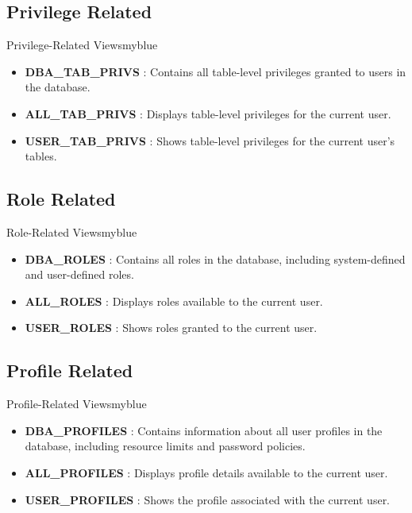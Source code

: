 \vspace{0.25cm}
\subsection{Privilege Related}
\begin{prettyBox}{Privilege-Related Views}{myblue}
\begin{itemize}
    \item \textbf{DBA\_TAB\_PRIVS} : Contains all table-level privileges granted to users in the database.
    \item \textbf{ALL\_TAB\_PRIVS} : Displays table-level privileges for the current user.
    \item \textbf{USER\_TAB\_PRIVS} : Shows table-level privileges for the current user's tables.
\end{itemize}
\end{prettyBox}

\vspace{0.25cm}
\subsection{Role Related}
\begin{prettyBox}{Role-Related Views}{myblue}
\begin{itemize}
    \item \textbf{DBA\_ROLES} : Contains all roles in the database, including system-defined and user-defined roles.
    \item \textbf{ALL\_ROLES} : Displays roles available to the current user.
    \item \textbf{USER\_ROLES} : Shows roles granted to the current user.
\end{itemize}
\end{prettyBox}

\vspace{0.25cm}
\subsection{Profile Related}
\begin{prettyBox}{Profile-Related Views}{myblue}
\begin{itemize}
    \item \textbf{DBA\_PROFILES} : Contains information about all user profiles in the database, including resource limits and password policies.
    \item \textbf{ALL\_PROFILES} : Displays profile details available to the current user.
    \item \textbf{USER\_PROFILES} : Shows the profile associated with the current user.
\end{itemize}
\end{prettyBox}

